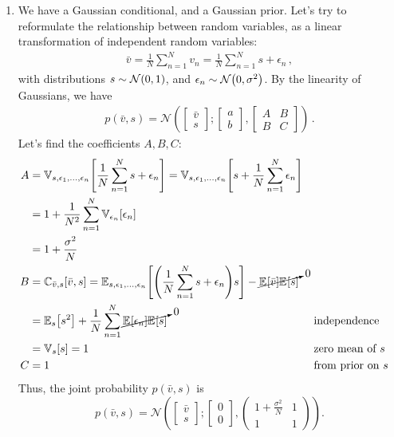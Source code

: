 \begin{enumerate}[label=\alph*.]
\item We have a Gaussian conditional, and a Gaussian prior. Let's try to reformulate the relationship between random variables, as a linear transformation of independent random variables:
\begin{align}
\bar v = \frac{1}{N}\sum_{n=1}^N v_n = \frac{1}{N}\sum_{n=1}^N s + \epsilon_n \,,
\end{align}
with distributions $s \sim \NormDist{0, 1}$, and $\epsilon_n \sim \NormDist{0, \sigma^2}$. By the linearity of Gaussians, we have
\begin{align}
p(\bar{v},s) = \mathcal{N}\left( \left[\begin{array}{c}
\bar{v}\\
s
\end{array}\right]; \left[\begin{array}{c}
a\\
b
\end{array}\right], \left[\begin{array}{cc}
A & B\\
B & C
\end{array}\right] \right)\,.
\end{align}
Let's find the coefficients $A, B, C$:
\begin{align}
A &= \Var{s, \epsilon_1,\dots,\epsilon_n}{\frac{1}{N}\sum_{n=1}^N s + \epsilon_n} = \Var{s, \epsilon_1,\dots,\epsilon_n}{s + \frac{1}{N}\sum_{n=1}^N\epsilon_n} \\
&= 1 + \frac{1}{N^2}\sum_{n=1}^N \Var{\epsilon_n}{\epsilon_n} \\
&= 1 + \frac{\sigma^2}{N} \\
B &= \Cov{\bar v, s}{\bar v, s} = \Exp{s, \epsilon_1, \dots, \epsilon_n}{\left(\frac{1}{N}\sum_{n=1}^N s + \epsilon_n\right)s} - \cancelto{0}{\Exp{}{\bar v}\Exp{}{s}} \\
&= \Exp{s}{s^2} + \frac{1}{N}\sum_{n=1}^N \cancelto{0}{\Exp{}{\epsilon_n}\Exp{}{s}} && \text{independence} \\
&= \Var{s}{s} = 1 && \text{zero mean of $s$} \\
C &= 1 && \text{from prior on $s$} 
\end{align}
Thus, the joint probability $p(\bar{v},s)$ is
\begin{equation}
p(\bar{v},s) = \mathcal{N}\left( \left[\begin{array}{c}
\bar{v}\\
s
\end{array}\right]; \left[\begin{array}{c}
0\\
0
\end{array}\right], \left(\begin{array}{cc}
1 + \frac{\sigma^2}{N} & 1\\
1 & 1
\end{array}\right) \right).
\end{equation}


\end{enumerate}
